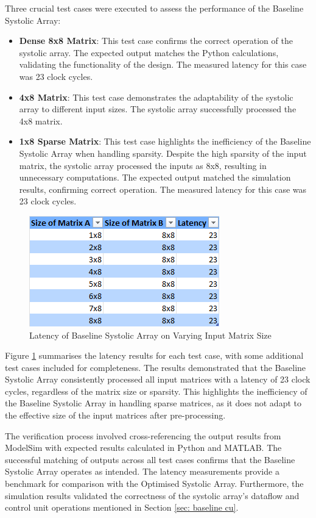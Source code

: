 \documentclass[12pt, a4paper, ukenglish]{article}
\newcommand{\baselineNxEight}{
    \begin{figure}[ht]
        \centering
        \includegraphics[width=0.3\linewidth]{results/Latency of Baseline Systolic Array on Varying Input Matrix Size.png}
        \caption{Latency of Baseline Systolic Array on Varying Input Matrix Size}
        \label{fig:latency_baseline_nxeight}
    \end{figure}
}
\begin{document}
    Three crucial test cases were executed to assess the performance of the Baseline Systolic Array:
    \begin{itemize}
        \item \textbf{Dense 8x8 Matrix}: This test case confirms the correct operation of the systolic array. The expected output matches the Python calculations, validating the functionality of the design. The measured latency for this case was 23 clock cycles.
        
        \item \textbf{4x8 Matrix}: This test case demonstrates the adaptability of the systolic array to different input sizes. The systolic array successfully processed the 4x8 matrix.
        
        \item \textbf{1x8 Sparse Matrix}: This test case highlights the inefficiency of the Baseline Systolic Array when handling sparsity. Despite the high sparsity of the input matrix, the systolic array processed the inputs as 8x8, resulting in unnecessary computations. The expected output matched the simulation results, confirming correct operation. The measured latency for this case was 23 clock cycles.

    \end{itemize}
    \baselineNxEight

    Figure \ref{fig:latency_baseline_nxeight} summarises the latency results for each test case, with some additional test cases included for completeness. The results demonstrated that the Baseline Systolic Array consistently processed all input matrices with a latency of 23 clock cycles, regardless of the matrix size or sparsity. This highlights the inefficiency of the Baseline Systolic Array in handling sparse matrices, as it does not adapt to the effective size of the input matrices after pre-processing.

    The verification process involved cross-referencing the output results from ModelSim with expected results calculated in Python and MATLAB. The successful matching of outputs across all test cases confirms that the Baseline Systolic Array operates as intended. The latency measurements provide a benchmark for comparison with the Optimised Systolic Array. Furthermore, the simulation results validated the correctness of the systolic array's dataflow and control unit operations mentioned in Section \ref{sec: baseline cu}.
\end{document}

